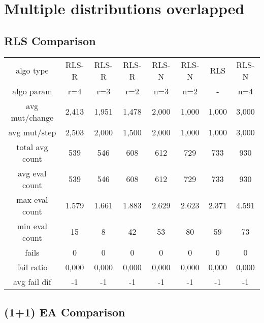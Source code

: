 
\section{Multiple distributions overlapped}

\subsection{RLS Comparison}


\begin{tabular}[h]{cccccccc}
algo type&           RLS-R&    RLS-R&    RLS-R&    RLS-N&    RLS-N&      RLS&    RLS-N\\
algo param&            r=4&      r=3&      r=2&      n=3&      n=2&        -&      n=4\\
avg mut/change&      2,413&    1,951&    1,478&    2,000&    1,000&    1,000&    3,000\\
avg mut/step&        2,503&    2,000&    1,500&    2,000&    1,000&    1,000&    3,000\\
\hline
total avg count&       539&      546&      608&      612&      729&      733&      930\\
avg eval count&        539&      546&      608&      612&      729&      733&      930\\
max eval count&      1.579&    1.661&    1.883&    2.629&    2.623&    2.371&    4.591\\
min eval count&         15&        8&       42&       53&       80&       59&       73\\
\hline
fails&                   0&        0&        0&        0&        0&        0&        0\\
fail ratio&          0,000&    0,000&    0,000&    0,000&    0,000&    0,000&    0,000\\
avg fail dif&           -1&       -1&       -1&       -1&       -1&       -1&       -1\\
\end{tabular}


\subsection{(1+1) EA Comparison}


